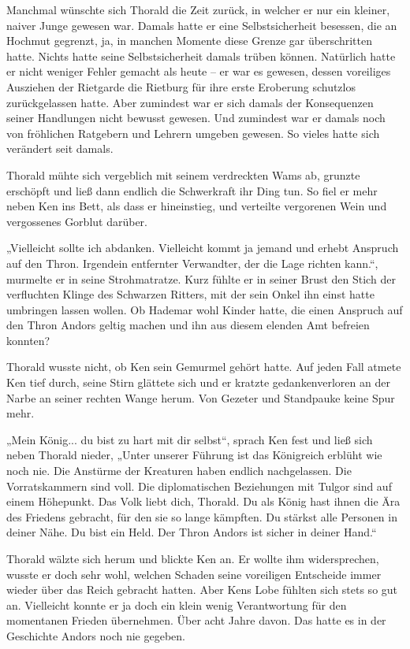 Manchmal wünschte sich Thorald die Zeit zurück, in welcher er nur ein kleiner, naiver Junge gewesen war. Damals hatte er eine Selbstsicherheit besessen, die an Hochmut gegrenzt, ja, in manchen Momente diese Grenze gar überschritten hatte. Nichts hatte seine Selbstsicherheit damals trüben können. Natürlich hatte er nicht weniger Fehler gemacht als heute – er war es gewesen, dessen voreiliges Ausziehen der Rietgarde die Rietburg für ihre erste Eroberung schutzlos zurückgelassen hatte. Aber zumindest war er sich damals der Konsequenzen seiner Handlungen nicht bewusst gewesen. Und zumindest war er damals noch von fröhlichen Ratgebern und Lehrern umgeben gewesen. So vieles hatte sich verändert seit damals.

Thorald mühte sich vergeblich mit seinem verdreckten Wams ab, grunzte erschöpft und ließ dann endlich die Schwerkraft ihr Ding tun. So fiel er mehr neben Ken ins Bett, als dass er hineinstieg, und verteilte vergorenen Wein und vergossenes Gorblut darüber.

„Vielleicht sollte ich abdanken. Vielleicht kommt ja jemand und erhebt Anspruch auf den Thron. Irgendein entfernter Verwandter, der die Lage richten kann.“, murmelte er in seine Strohmatratze. Kurz fühlte er in seiner Brust den Stich der verfluchten Klinge des Schwarzen Ritters, mit der sein Onkel ihn einst hatte umbringen lassen wollen. Ob Hademar wohl Kinder hatte, die einen Anspruch auf den Thron Andors geltig machen und ihn aus diesem elenden Amt befreien konnten?

Thorald wusste nicht, ob Ken sein Gemurmel gehört hatte. Auf jeden Fall atmete Ken tief durch, seine Stirn glättete sich und er kratzte gedankenverloren an der Narbe an seiner rechten Wange herum. Von Gezeter und Standpauke keine Spur mehr.

„Mein König... du bist zu hart mit dir selbst“, sprach Ken fest und ließ sich neben Thorald nieder, „Unter unserer Führung ist das Königreich erblüht wie noch nie. Die Anstürme der Kreaturen haben endlich nachgelassen. Die Vorratskammern sind voll. Die diplomatischen Beziehungen mit Tulgor sind auf einem Höhepunkt. Das Volk liebt dich, Thorald. Du als König hast ihnen die Ära des Friedens gebracht, für den sie so lange kämpften. Du stärkst alle Personen in deiner Nähe. Du bist ein Held. Der Thron Andors ist sicher in deiner Hand.“

Thorald wälzte sich herum und blickte Ken an. Er wollte ihm widersprechen, wusste er doch sehr wohl, welchen Schaden seine voreiligen Entscheide immer wieder über das Reich gebracht hatten. Aber Kens Lobe fühlten sich stets so gut an. Vielleicht konnte er ja doch ein klein wenig Verantwortung für den momentanen Frieden übernehmen. Über acht Jahre davon. Das hatte es in der Geschichte Andors noch nie gegeben.

